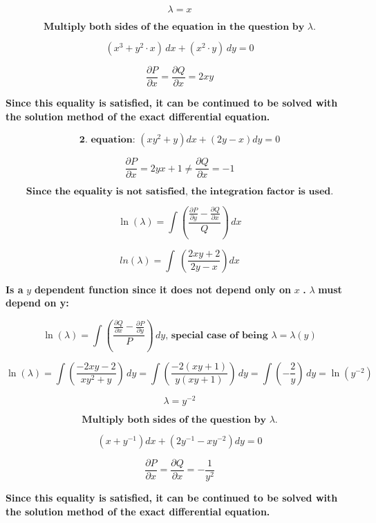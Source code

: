 \documentclass{article}
\begin{document}
    \[
    \lambda = x
    \]
    
    \[
    \textbf{Multiply both sides of the equation in the question by } \lambda \textbf{.}
    \]
    
    \[
    (x^3 + y^2 \cdot x) \, dx + (x^2 \cdot y) \, dy = 0
    \]
    
    \[
    \frac{\partial P}{\partial x} = \frac{\partial Q}{\partial x} = 2xy
    \]
    
    \textbf{Since this equality is satisfied, it can be continued to be solved with the solution method of the exact differential equation.}

    \[
    \textbf{2. equation: } \left(xy^2 + y\right)dx + \left(2y - x\right)dy = 0
    \]
    
    \[
    \frac{\partial P}{\partial x} = 2yx + 1 \neq \frac{\partial Q}{\partial x} = -1
    \]
    
    \[
    \textbf{Since the equality is not satisfied, the integration factor is used.}
    \]
    
    \[
    \ln(\lambda) = \int \left(\frac{\frac{\partial P}{\partial y} - \frac{\partial Q}{\partial x}}{Q}\right) \, dx
    \]

    \[
    ln\left(\lambda \right)=\int \:\left(\frac{2xy+2}{2y-x}\right)dx
    \]

    \textbf{Is a } $y$ \textbf{dependent function since it does not depend only on } $x$ \textbf{. } $\lambda$ \textbf{ must depend on y:}
    
    \[
    \ln(\lambda) = \int \left(\frac{\frac{\partial Q}{\partial x} - \frac{\partial P}{\partial y}}{P}\right) \, dy \textbf{, special case of being } \lambda = \lambda \left(y\right)
    \]

    \[
    \ln(\lambda) = \int \left(\frac{-2xy - 2}{xy^2 + y}\right) \, dy = \int \left(\frac{-2(xy + 1)}{y(xy + 1)}\right) \, dy = \int \left(-\frac{2}{y}\right) \, dy = \ln(y^{-2})
    \]

    \[
    \lambda = y^{-2}
    \]

    \[
    \textbf{Multiply both sides of the question by } \lambda \textbf{.}
    \]

    \[
    \left(x + y^{-1}\right)dx + \left(2y^{-1} - xy^{-2}\right)dy = 0
    \]
    
    \[
    \frac{\partial P}{\partial x} = \frac{\partial Q}{\partial x} = - \frac{1}{y^2}
    \]
    
    \textbf{Since this equality is satisfied, it can be continued to be solved with the solution method of the exact differential equation.}
\\~\\
\end{document}
